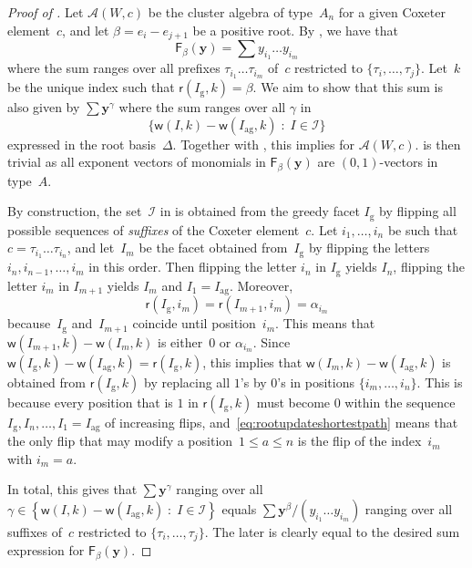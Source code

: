 \documentclass[10pt]{amsart}
\theoremstyle{definition}\newtheorem{rema}[theo]{Remark}\newtheorem{exem}[theo]{Example}
\newcommand{\y}{\mathbf{y}}
\newcommand{\Alg}{\mathcal{A}}
\newcommand{\greedy}{I_{\operatorname{g}}}
\newcommand{\antigreedy}{I_{\operatorname{ag}}}
\newcommand{\Fpoly}[2]{{\mathsf{F}_{#1}(#2)}}
\newcommand{\sfr}{\mathsf{r}}
\newcommand{\sfw}{\mathsf{w}}
\newcommand{\Root}[2]{{\sfr}(#1,#2)}
\newcommand{\Weight}[2]{{\sfw}(#1,#2)}
\newcommand{\set}[2]{\left\{ #1 \;:\; #2 \right\}}
\newcommand{\bigset}[2]{\big\{ #1 \;:\; #2 \big\}}
\begin{document}
\begin{proof}[Proof of ]
Let $\Alg(W,c)$ be the cluster algebra of type~$A_n$ for a given Coxeter element~$c$, and let $\beta = e_i - e_{j+1}$ be a positive root. By , we have that
\begin{equation*}\label{eq:Fpolysum}
\Fpoly{\beta}{\y} = \sum y_{i_1}\dots y_{i_m}
\end{equation*}
where the sum ranges over all prefixes $\tau_{i_1} \dots \tau_{i_m}$ of~$c$ restricted to $\{\tau_i,\dots,\tau_{j}\}$. Let~$k$ be the unique index such that $\Root{\greedy}{k} = \beta$. We aim to show that this sum is also given by $\sum \y^\gamma$ where the sum ranges over all $\gamma$ in
\[
\bigset{ \Weight{I}{k} - \Weight{\antigreedy}{k}}{ I \in \mathcal{I} }
\]
expressed in the root basis~$\Delta$. Together with , this implies  for $\Alg(W,c)$.  is then trivial as all exponent vectors of monomials in $\Fpoly{\beta}{\y}$ are $(0,1)$-vectors in type~$A$.


By construction, the set~$\mathcal{I}$ in  is obtained from the greedy facet $\greedy$ by flipping all possible sequences of \emph{suffixes} of the Coxeter element~$c$. Let $i_1,\dots,i_n$ be such that $c = \tau_{i_1} \dots \tau_{i_n}$, and let~$I_m$ be the facet obtained from~$\greedy$ by flipping the letters $i_n,i_{n-1},\dots,i_m$ in this order. Then flipping the letter $i_n$ in $\greedy$ yields $I_n$, flipping the letter $i_m$ in $I_{m+1}$ yields $I_m$ and $I_1 = \antigreedy$. Moreover,
\begin{equation}\label{eq:rootupdateshortestpath}
\Root{\greedy}{i_m} = \Root{I_{m+1}}{i_m} = \alpha_{i_m}
\end{equation}
because~$\greedy$ and~$I_{m+1}$ coincide until position~$i_m$. This means that $\Weight{I_{m+1}}{k} - \Weight{I_m}{k}$ is either~$0$ or $\alpha_{i_m}$. Since $\Weight{\greedy}{k} - \Weight{\antigreedy}{k} = \Root{\greedy}{k}$, this implies that $\Weight{I_{m}}{k} - \Weight{\antigreedy}{k}$ is obtained from $\Root{\greedy}{k}$ by replacing all $1$'s by $0$'s in positions $\{i_m,\dots,i_n\}$. This is because every position that is $1$ in $\Root{\greedy}{k}$ must become $0$ within the sequence $\greedy,I_n,\dots,I_1=\antigreedy$ of increasing flips, and~\eqref{eq:rootupdateshortestpath} means that the only flip that may modify a position~$1 \leq a \leq n$ is the flip of the index~$i_m$ with $i_m = a$.

In total, this gives that $\sum \y^\gamma$ ranging over all $\gamma \in \set{ \Weight{I}{k} - \Weight{\antigreedy}{k}}{ I \in \mathcal{I} }$ equals $\sum \y^\beta / (y_{i_1}\dots y_{i_m})$ ranging over all suffixes of~$c$ restricted to $\{\tau_i,\dots,\tau_j\}$. The later is clearly equal to the desired sum expression for $\Fpoly{\beta}{\y}$.
\end{proof}
\end{document}
